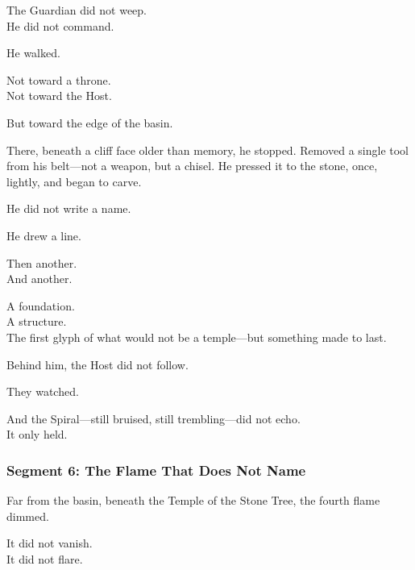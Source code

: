 \documentclass[9pt]{article}
\begin{document}
\vspace{0.5em}
The Guardian did not weep.\\
He did not command.

\vspace{0.5em}
He walked.

\vspace{0.5em}
Not toward a throne.\\
Not toward the Host.

\vspace{0.5em}
But toward the edge of the basin.

\vspace{0.5em}
There, beneath a cliff face older than memory, he stopped. Removed a single tool from his belt---not a weapon, but a chisel. He pressed it to the stone, once, lightly, and began to carve.

\vspace{0.5em}
He did not write a name.

\vspace{0.5em}
He drew a line.

\vspace{0.5em}
Then another.\\
And another.

\vspace{0.5em}
A foundation.\\
A structure.\\
The first glyph of what would not be a temple---but something made to last.

\vspace{0.5em}
Behind him, the Host did not follow.

\vspace{0.5em}
They watched.

\vspace{0.5em}
And the Spiral---still bruised, still trembling---did not echo.\\
It only held.


\newpage

\subsubsection*{Segment 6: The Flame That Does Not Name}

Far from the basin, beneath the Temple of the Stone Tree, the fourth flame dimmed.

\vspace{0.5em}
It did not vanish.\\
It did not flare.
\end{document}
